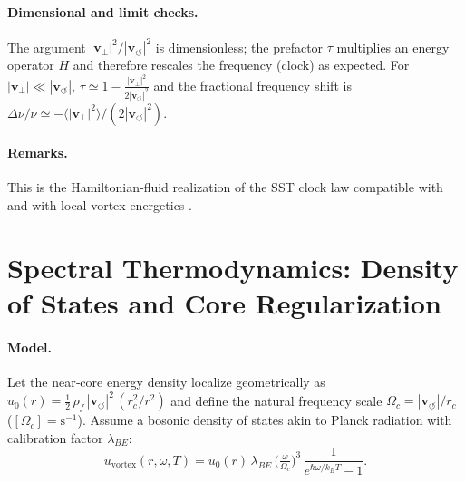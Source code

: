 \documentclass[10pt,reprint,aps,onecolumn,nofootinbib]{revtex4-2}
\begin{document}
    \paragraph{Dimensional and limit checks.}
        The argument \( |\mathbf{v}_\perp|^{2}/|\mathbf{v}_{\!\boldsymbol{\circlearrowleft}}|^{2}\) is dimensionless; the prefactor \(\tau\) multiplies an energy operator \(H\) and therefore rescales the frequency (clock) as expected. For \(|\mathbf{v}_\perp|\ll |\mathbf{v}_{\!\boldsymbol{\circlearrowleft}}|\),
        \(\tau\simeq 1-\tfrac{|\mathbf{v}_\perp|^{2}}{2|\mathbf{v}_{\!\boldsymbol{\circlearrowleft}}|^{2}}\) and the fractional frequency shift is
        \(\Delta\nu/\nu\simeq-\langle|\mathbf{v}_\perp|^{2}\rangle/(2|\mathbf{v}_{\!\boldsymbol{\circlearrowleft}}|^{2})\).

    \paragraph{Remarks.}
        This is the Hamiltonian‐fluid realization of the SST clock law compatible with
        \cite{Salmon1988,Morrison1998} and with local vortex energetics
        \cite{Saffman1992,Batchelor1967,LandauFM}.


\section{Spectral Thermodynamics: Density of States and Core Regularization}
\label{app:vortex-spectral-thermo}

    \paragraph{Model.}
        Let the near‐core energy density localize geometrically as
        \(u_0(r)=\tfrac12\,\rho_{\!f}\,|\mathbf{v}_{\!\boldsymbol{\circlearrowleft}}|^{2}\,(r_c^{2}/r^{2})\)
        and define the natural frequency scale \(\Omega_c=|\mathbf{v}_{\!\boldsymbol{\circlearrowleft}}|/r_c\)
        (\([\Omega_c]=\mathrm{s^{-1}}\)).
        Assume a bosonic density of states akin to Planck radiation with calibration factor \(\lambda_{\!BE}\):
        \begin{equation}
        u_{\mathrm{vortex}}(r,\omega,T)=u_0(r)\,\lambda_{\!BE}\,
        \Big(\tfrac{\omega}{\Omega_c}\Big)^{3}\,\frac{1}{e^{\hbar\omega/k_B T}-1}.
        \end{equation}
\end{document}
